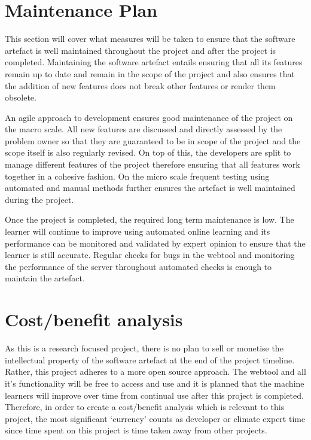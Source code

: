 \documentclass[11pt]{article} %
\numberwithin{equation}{section}
\begin{document}
\section{Maintenance Plan}
\quad This section will cover what measures will be taken to ensure that the software artefact is well maintained throughout the project and after the project is completed. Maintaining the software artefact entails ensuring that all its features remain up to date and remain in the scope of the project and also ensures that the addition of new features does not break other features or render them obsolete.\par

\quad An agile approach to development ensures good maintenance of the project on the macro scale. All new features are discussed and directly assessed by the problem owner so that they are guaranteed to be in scope of the project and the scope itself is also regularly revised. On top of this, the developers are split to manage different features of the project therefore ensuring that all features work together in a cohesive fashion. On the micro scale frequent testing using automated and manual methods further ensures the artefact is well maintained during the project.\par

\quad Once the project is completed, the required long term maintenance is low. The learner will continue to improve using automated online learning and its performance can be monitored and validated by expert opinion to ensure that the learner is still accurate. Regular checks for bugs in the webtool and monitoring the performance of the server throughout automated checks is enough to maintain the artefact.

\section{Cost/benefit analysis}
\quad As this is a research focused project, there is no plan to sell or monetise the intellectual property of the software artefact at the end of the project timeline. Rather, this project adheres to a more open source approach. The webtool and all it’s functionality will be free to access and use and it is planned that the machine learners will improve over time from continual use after this project is completed. Therefore, in order to create a cost/benefit analysis which is relevant to this project, the most significant ‘currency’ counts as developer or climate expert time since time spent on this project is time taken away from other projects.
\end{document}
